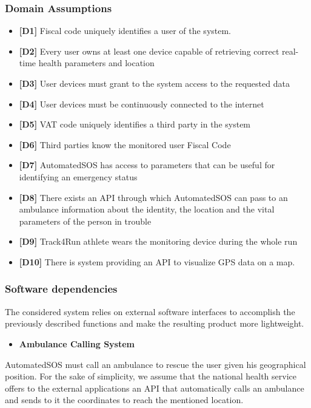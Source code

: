 \subsubsection{Domain Assumptions}
\begin{itemize}
	\item \textbf{[D1]} Fiscal code uniquely identifies a user of the system.
	\item \textbf{[D2]} Every user owns at least one device capable of retrieving correct real-time health parameters and location
	\item \textbf{[D3]} User devices must grant to the system access to the requested data
	\item \textbf{[D4]} User devices must be continuously connected to the internet
	\item \textbf{[D5]} VAT code uniquely identifies a third party in the system
	\item \textbf{[D6]} Third parties know the monitored user Fiscal Code
	\item \textbf{[D7]} AutomatedSOS has access to parameters that can be useful for identifying an emergency status
	\item \textbf{[D8]} There exists an API through which AutomatedSOS can pass to an ambulance information about the identity, the location and the vital parameters of the person in trouble
	\item \textbf{[D9]} Track4Run athlete wears the monitoring device during the whole run
	\item \textbf{[D10]} There is system providing an API to visualize GPS data on a map.
\end{itemize}

\subsubsection{Software dependencies}
The considered system relies on external software interfaces to accomplish the previously described functions and make the resulting product more lightweight.

\begin{itemize}
	\item \textbf{Ambulance Calling System}
\end{itemize}

AutomatedSOS must call an ambulance to rescue the user given his geographical position. For the sake of simplicity, we assume that the national health service offers to the external applications an API that automatically calls an ambulance and sends to it the coordinates to reach the mentioned location.

